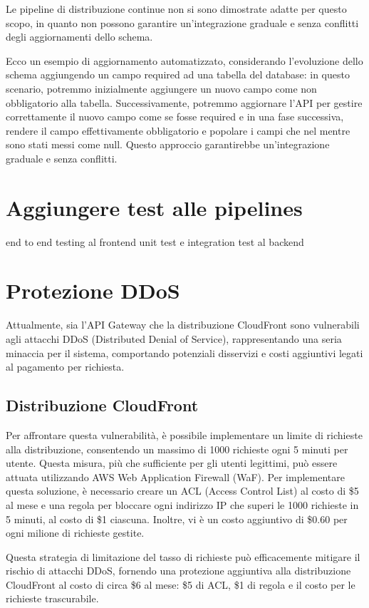 Le pipeline di distribuzione continue non si sono dimostrate adatte per questo scopo, in quanto non possono garantire un'integrazione graduale e senza conflitti degli aggiornamenti dello schema.

Ecco un esempio di aggiornamento automatizzato, considerando l'evoluzione dello schema aggiungendo un campo required ad una tabella del database: 
in questo scenario, potremmo inizialmente aggiungere un nuovo campo come non obbligatorio alla tabella. Successivamente, potremmo aggiornare l'API per gestire correttamente il nuovo campo come se fosse required e in una fase successiva, rendere il campo effettivamente obbligatorio e popolare i campi che nel mentre sono stati messi come null. Questo approccio garantirebbe un'integrazione graduale e senza conflitti.

\section{Aggiungere test alle pipelines}
\label{testing_pipeline}
end to end testing al frontend
unit test e integration test al backend

\section{Protezione DDoS}
Attualmente, sia l'API Gateway che la distribuzione CloudFront sono vulnerabili agli attacchi DDoS (Distributed Denial of Service), rappresentando una seria minaccia per il sistema, comportando potenziali disservizi e costi aggiuntivi legati al pagamento per richiesta.



\subsection{Distribuzione CloudFront}
Per affrontare questa vulnerabilità, è possibile implementare un limite di richieste alla distribuzione, consentendo un massimo di 1000 richieste ogni 5 minuti per utente. Questa misura, più che sufficiente per gli utenti legittimi, può essere attuata utilizzando AWS Web Application Firewall (WaF). 
Per implementare questa soluzione, è necessario creare un ACL (Access Control List) al costo di \$5 al mese e una regola per bloccare ogni indirizzo IP che superi le 1000 richieste in 5 minuti, al costo di \$1 ciascuna. Inoltre, vi è un costo aggiuntivo di \$0.60 per ogni milione di richieste gestite.

Questa strategia di limitazione del tasso di richieste può efficacemente mitigare il rischio di attacchi DDoS, fornendo una protezione aggiuntiva alla distribuzione CloudFront al costo di circa \$6 al mese: \$5 di ACL, \$1 di regola e il costo per le richieste trascurabile.

